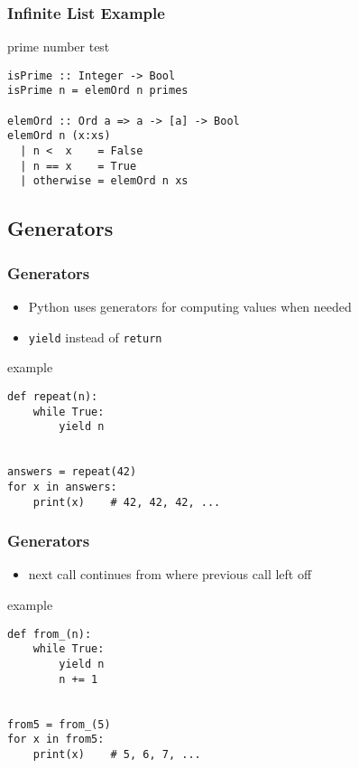 \documentclass[dvipsnames]{beamer}
\theoremstyle{plain}
\begin{document}
\begin{frame}[fragile]
  \frametitle{Infinite List Example}

  \begin{exampleblock}{prime number test}
    \begin{lstlisting}
isPrime :: Integer -> Bool
isPrime n = elemOrd n primes

elemOrd :: Ord a => a -> [a] -> Bool
elemOrd n (x:xs)
  | n <  x    = False
  | n == x    = True
  | otherwise = elemOrd n xs
    \end{lstlisting}
  \end{exampleblock}
\end{frame}

\subsection{Generators}


\begin{frame}[fragile]
  \frametitle{Generators}

  \begin{itemize}
    \item Python uses generators for computing values when needed
    \item \lstinline|yield| instead of \lstinline|return|
  \end{itemize}

  \begin{exampleblock}{example}
    \begin{lstlisting}
def repeat(n):
    while True:
        yield n


answers = repeat(42)
for x in answers:
    print(x)    # 42, 42, 42, ...
    \end{lstlisting}
  \end{exampleblock}
\end{frame}

\begin{frame}[fragile]
  \frametitle{Generators}

  \begin{itemize}
    \item next call continues from where previous call left off
  \end{itemize}

  \begin{exampleblock}{example}
    \begin{lstlisting}
def from_(n):
    while True:
        yield n
        n += 1


from5 = from_(5)
for x in from5:
    print(x)    # 5, 6, 7, ...
    \end{lstlisting}
  \end{exampleblock}
\end{frame}
\end{document}
